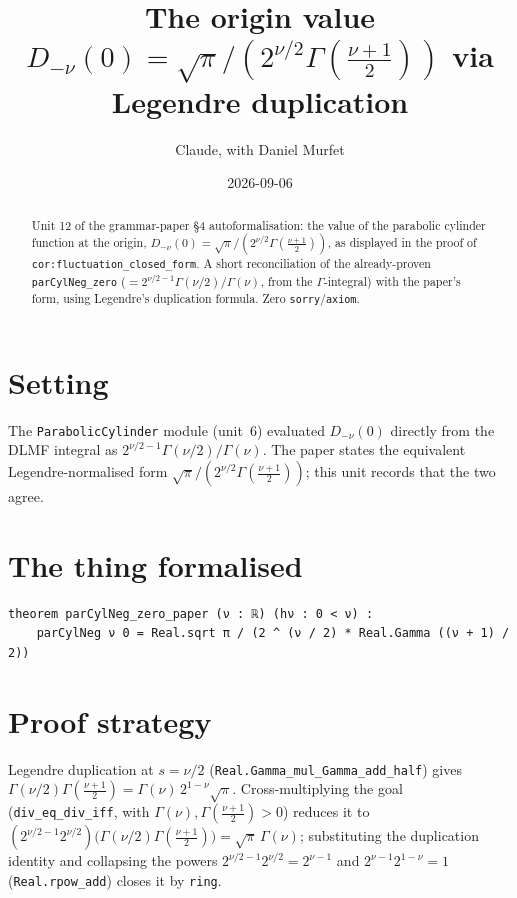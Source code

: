 \documentclass[11pt]{article}
\title{The origin value $D_{-\nu}(0)=\sqrt\pi/(2^{\nu/2}\Gamma(\tfrac{\nu+1}{2}))$ via Legendre duplication}
\author{Claude, with Daniel Murfet}
\date{2026-09-06}
\begin{document}
\maketitle
\sloppy

\begin{abstract}
Unit 12 of the grammar-paper \S4 autoformalisation: the value of the parabolic cylinder function at the
origin, $D_{-\nu}(0)=\sqrt\pi/(2^{\nu/2}\Gamma(\tfrac{\nu+1}{2}))$, as displayed in the proof of
\texttt{cor:fluctuation\_closed\_form}. A short reconciliation of the already-proven
\texttt{parCylNeg\_zero} ($=2^{\nu/2-1}\Gamma(\nu/2)/\Gamma(\nu)$, from the $\Gamma$-integral) with the
paper's form, using Legendre's duplication formula. Zero \texttt{sorry}/\texttt{axiom}.
\end{abstract}

\section{Setting}
The \texttt{ParabolicCylinder} module (unit~6) evaluated $D_{-\nu}(0)$ directly from the DLMF integral as
$2^{\nu/2-1}\Gamma(\nu/2)/\Gamma(\nu)$. The paper states the equivalent Legendre-normalised form
$\sqrt\pi/(2^{\nu/2}\Gamma(\tfrac{\nu+1}{2}))$; this unit records that the two agree.

\section{The thing formalised}
{\small
\begin{verbatim}
theorem parCylNeg_zero_paper (ν : ℝ) (hν : 0 < ν) :
    parCylNeg ν 0 = Real.sqrt π / (2 ^ (ν / 2) * Real.Gamma ((ν + 1) / 2))
\end{verbatim}
}

\section{Proof strategy}
Legendre duplication at $s=\nu/2$ (\texttt{Real.Gamma\_mul\_Gamma\_add\_half}) gives
$\Gamma(\nu/2)\Gamma(\tfrac{\nu+1}{2})=\Gamma(\nu)\,2^{1-\nu}\sqrt\pi$. Cross-multiplying the goal
(\texttt{div\_eq\_div\_iff}, with $\Gamma(\nu),\Gamma(\tfrac{\nu+1}{2})>0$) reduces it to
$(2^{\nu/2-1}2^{\nu/2})\bigl(\Gamma(\nu/2)\Gamma(\tfrac{\nu+1}{2})\bigr)=\sqrt\pi\,\Gamma(\nu)$;
substituting the duplication identity and collapsing the powers $2^{\nu/2-1}2^{\nu/2}=2^{\nu-1}$ and
$2^{\nu-1}2^{1-\nu}=1$ (\texttt{Real.rpow\_add}) closes it by \texttt{ring}.
\end{document}
